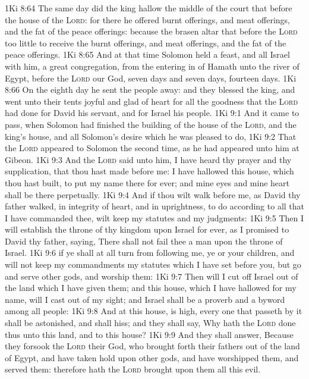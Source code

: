 \vs 1Ki 8:64 The same day did the king hallow the middle of the court that  before the house of the \textsc{Lord}: for there he offered burnt offerings, and meat offerings, and the fat of the peace offerings: because the brasen altar that  before the \textsc{Lord}  too little to receive the burnt offerings, and meat offerings, and the fat of the peace offerings.
\vs 1Ki 8:65 And at that time Solomon held a feast, and all Israel with him, a great congregation, from the entering in of Hamath unto the river of Egypt, before the \textsc{Lord} our God, seven days and seven days,  fourteen days.
\vs 1Ki 8:66 On the eighth day he sent the people away: and they blessed the king, and went unto their tents joyful and glad of heart for all the goodness that the \textsc{Lord} had done for David his servant, and for Israel his people.
\vs 1Ki 9:1 And it came to pass, when Solomon had finished the building of the house of the \textsc{Lord}, and the king's house, and all Solomon's desire which he was pleased to do,
\vs 1Ki 9:2 That the \textsc{Lord} appeared to Solomon the second time, as he had appeared unto him at Gibeon.
\vs 1Ki 9:3 And the \textsc{Lord} said unto him, I have heard thy prayer and thy supplication, that thou hast made before me: I have hallowed this house, which thou hast built, to put my name there for ever; and mine eyes and mine heart shall be there perpetually.
\vs 1Ki 9:4 And if thou wilt walk before me, as David thy father walked, in integrity of heart, and in uprightness, to do according to all that I have commanded thee,  wilt keep my statutes and my judgments:
\vs 1Ki 9:5 Then I will establish the throne of thy kingdom upon Israel for ever, as I promised to David thy father, saying, There shall not fail thee a man upon the throne of Israel.
\vs 1Ki 9:6  if ye shall at all turn from following me, ye or your children, and will not keep my commandments  my statutes which I have set before you, but go and serve other gods, and worship them:
\vs 1Ki 9:7 Then will I cut off Israel out of the land which I have given them; and this house, which I have hallowed for my name, will I cast out of my sight; and Israel shall be a proverb and a byword among all people:
\vs 1Ki 9:8 And at this house,  is high, every one that passeth by it shall be astonished, and shall hiss; and they shall say, Why hath the \textsc{Lord} done thus unto this land, and to this house?
\vs 1Ki 9:9 And they shall answer, Because they forsook the \textsc{Lord} their God, who brought forth their fathers out of the land of Egypt, and have taken hold upon other gods, and have worshipped them, and served them: therefore hath the \textsc{Lord} brought upon them all this evil.
